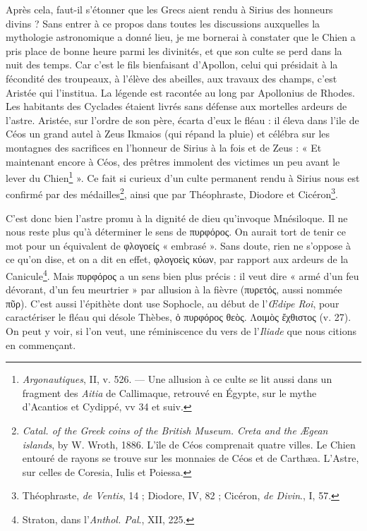 \documentclass{book}%
\newcommand{\italique}[1]{\textit{#1}}%
\newcommand{\note}[1]{\footnote{#1}}
\begin{document}
Après cela, faut-il s'étonner que les Grecs aient rendu à Sirius des honneurs divins ? Sans entrer à ce propos dans toutes les discussions auxquelles la mythologie astronomique a donné lieu, je me bornerai à constater que le Chien a pris place de bonne heure parmi les divinités, et que son culte se perd dans la nuit des temps. Car c'est le fils bienfaisant d'Apollon, celui qui présidait à la fécondité des troupeaux, à l'élève des abeilles, aux travaux des champs, c'est Aristée qui l'institua. La légende est racontée au long par Apollonius de Rhodes. Les habitants des Cyclades étaient livrés sans défense aux mortelles ardeurs de l'astre. Aristée, sur l'ordre de son père, écarta d'eux le fléau : il éleva dans l'ile de Céos un grand autel à Zeus Ikmaios (qui répand la pluie) et célébra sur les montagnes des sacrifices en l'honneur de Sirius à la fois et de Zeus : « Et maintenant encore à Céos, des prêtres immolent des victimes un peu avant le lever du Chien\note{\italique{Argonautiques}, II, v. 526. — Une allusion à ce culte se lit aussi dans un fragment des \italique{Aitia} de Callimaque, retrouvé en Égypte, sur le mythe d'Acantios et Cydippé, vv 34 et suiv.} ». Ce fait si curieux d'un culte permanent rendu à Sirius nous est confirmé par des médailles\note{\italique{Catal. of the Greek coins of the British Museum. Creta and the Ægean islands}, by W. Wroth, 1886. L'île de Céos comprenait quatre villes. Le Chien entouré de rayons se trouve sur les monnaies de Céos et de Carthæa. L'Astre, sur celles de Coresia, Iulis et Poiessa.}, ainsi que par Théophraste, Diodore et Cicéron\note{Théophraste, \italique{de Ventis}, 14 ; Diodore, IV, 82 ; Cicéron, \italique{de Divin}., I, 57.}. 

C'est donc bien l'astre promu à la dignité de dieu qu'invoque Mnésiloque. Il ne nous reste plus qu'à déterminer le sens de πυρφόρος. On aurait tort de tenir ce mot pour un équivalent de φλογοείς « embrasé ». Sans doute, rien ne s'oppose à ce qu'on dise, et on a dit en effet, φλογοεὶς κύων, par rapport aux ardeurs de la Canicule\note{Straton, dans l'\italique{Anthol. Pal}., XII, 225.}. Mais πυρφόρος  a un sens bien plus précis : il veut dire « armé d'un feu dévorant, d'un feu meurtrier » par allusion à la fièvre (πυρετός, aussi nommée πῦρ). C'est aussi l'épithète dont use Sophocle, au début de l'\italique{Œdipe Roi}, pour caractériser le fléau qui désole Thèbes, ὁ πυρφόρος θεὸς. Λοιμὸς ἔχθιστος (v. 27). On peut y voir, si l'on veut, une réminiscence du vers de l'\italique{Iliade} que nous citions en commençant. 
\end{document}
